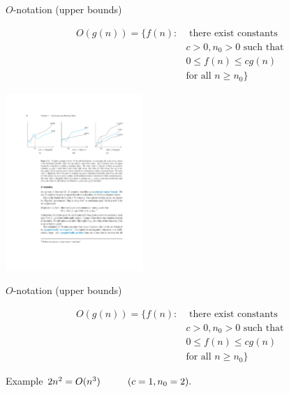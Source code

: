 \documentclass{beamer}
\begin{document}
\begin{frame}{$O$-notation (upper bounds)}
    \begin{tcolorbox}
        \vspace{-3mm}
        \begin{align*}
            O(g(n)) = \{ f(n):  & \text{ there exist constants } \\
                                                   & c > 0, n_0 > 0 \text{ such that } \\
                                                   & 0 \leq f(n) \leq cg(n) \\
                                                   & \text{for all } n \geq n_0\}
        \end{align*}
    \end{tcolorbox}
    \vspace{5mm}
    \centering
    \includegraphics[width=0.39\textwidth, trim={3.25cm 18.75cm 13.85cm 4.60cm}, clip]{figures/bigs}
\end{frame}

\begin{frame}{$O$-notation (upper bounds)}
    \begin{tcolorbox}
        \vspace{-3mm}
        \begin{align*}
            O(g(n)) = \{ f(n):  & \text{ there exist constants } \\
                                                   & c > 0, n_0 > 0 \text{ such that } \\
                                                   & 0 \leq f(n) \leq cg(n) \\
                                                   & \text{for all } n \geq n_0\}
        \end{align*}
    \end{tcolorbox}
    \begin{block}{Example}
        $2n^2 = O(n^3) \hspace{10mm} (c = 1, n_0 = 2).$
    \end{block}
\end{frame}
\end{document}
